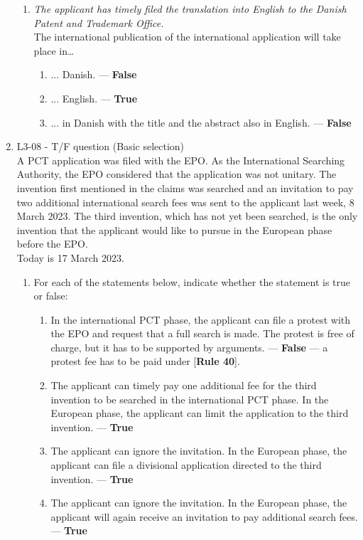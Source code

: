\documentclass{report}
\begin{document}
\begin{enumerate}[label=\textbf{Answer \arabic*}]
\begin{enumerate}[label=(\alph*)]
        \item \textit{The applicant has timely filed the translation into English to the Danish Patent and Trademark Office.} \\
        The international publication of the international application will take place in…
        \begin{enumerate}[label={(\alph{enumi}.\arabic*)}]
            \item ... Danish. --- \textbf{False}
            \item ... English. --- \textbf{True}
            \item ... in Danish with the title and the abstract also in English. --- \textbf{False}
        \end{enumerate}
    \end{enumerate}

    \item %
    L3-08 - T/F question (Basic selection) \\
    A PCT application was filed with the EPO. As the International Searching Authority, the EPO considered that the application was not unitary. The invention first mentioned in the claims was searched and an invitation to pay two additional international search fees was sent to the applicant last week, 8 March 2023. The third invention, which has not yet been searched, is the only invention that the applicant would like to pursue in the European phase before the EPO. \\
    Today is 17 March 2023.
    \begin{enumerate}[label=(\alph*)]
        \item For each of the statements below, indicate whether the statement is true or false:
        \begin{enumerate}[label={(\alph{enumi}.\arabic*)}]
            \item In the international PCT phase, the applicant can file a protest with the EPO and request that a full search is made. The protest is free of charge, but it has to be supported by arguments. --- \textbf{False} --- a protest fee has to be paid under [\textbf{Rule 40}].
            \item The applicant can timely pay one additional fee for the third invention to be searched in the international PCT phase. In the European phase, the applicant can limit the application to the third invention. --- \textbf{True}
            \item The applicant can ignore the invitation. In the European phase, the applicant can file a divisional application directed to the third invention. --- \textbf{True}
            \item The applicant can ignore the invitation. In the European phase, the applicant will again receive an invitation to pay additional search fees. --- \textbf{True}
        \end{enumerate}
        

\end{enumerate}
\end{enumerate}
\end{document}
